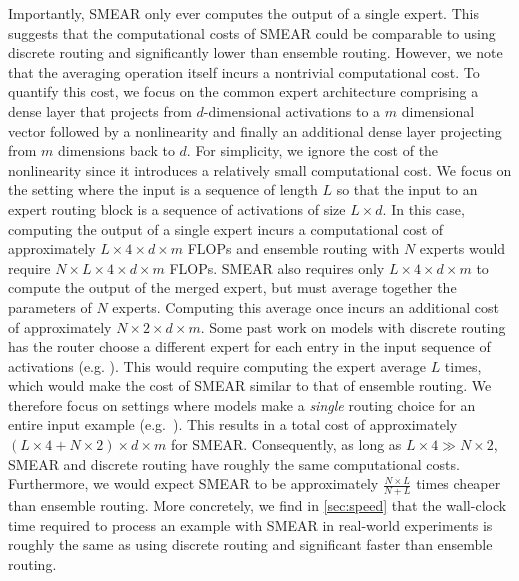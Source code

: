 \documentclass{article}
\theoremstyle{plain}
\theoremstyle{definition}
\theoremstyle{remark}
\begin{document}
Importantly, SMEAR only ever computes the output of a single expert.
This suggests that the computational costs of SMEAR could be comparable to using discrete routing and significantly lower than ensemble routing.
However, we note that the averaging operation itself incurs a nontrivial computational cost.
To quantify this cost, we focus on the common expert architecture comprising a dense layer that projects from $d$-dimensional activations to a $m$ dimensional vector followed by a nonlinearity and finally an additional dense layer projecting from $m$ dimensions back to $d$.
For simplicity, we ignore the cost of the nonlinearity since it introduces a relatively small computational cost.
We focus on the setting where the input is a sequence of length $L$ so that the input to an expert routing block is a sequence of activations of size $L \times d$.
In this case, computing the output of a single expert incurs a computational cost of approximately $L \times 4 \times d \times m$ FLOPs and ensemble routing with $N$ experts would require $N \times L \times 4 \times d \times m$ FLOPs.
SMEAR also requires only $L \times 4 \times d \times m$ to compute the output of the merged expert, but must average together the parameters of $N$ experts.
Computing this average once incurs an additional cost of approximately $N \times 2 \times d \times m$.
Some past work on models with discrete routing has the router choose a different expert for each entry in the input sequence of activations (e.g. \citealp{fedus2021switch,lewis2021base,roller2021hash}).
This would require computing the expert average $L$ times, which would make the cost of SMEAR similar to that of ensemble routing.
We therefore focus on settings where models make a \textit{single} routing choice for an entire input example (e.g.\ \citealp{shazeer2017outrageously,gururangan2021demix,kudugunta2021beyond,ye2022eliciting}).
This results in a total cost of approximately $(L \times 4 + N \times 2) \times d \times m$ for SMEAR.
Consequently, as long as $L \times 4 \gg N \times 2$, SMEAR and discrete routing have roughly the same computational costs.
Furthermore, we would expect SMEAR to be approximately $\frac{N \times L}{N + L}$ times cheaper than ensemble routing.
More concretely, we find in \cref{sec:speed} that the wall-clock time required to process an example with SMEAR in real-world experiments is roughly the same as using discrete routing and significant faster than ensemble routing. 
\end{document}
